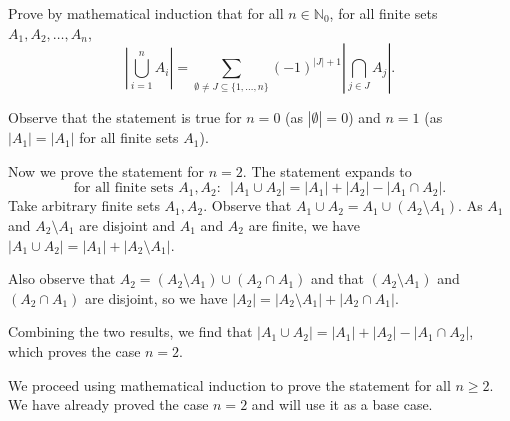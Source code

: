 \documentclass[]{exercises}
\newcommand{\N}{\mathbb{N}}
\begin{document}
\begin{questions}
	\question
	Prove by mathematical induction that for all $n\in\N_0$, for all finite sets $A_1,A_2,\dots,A_n$, \[\left|\bigcup_{i=1}^n A_i\right| = \sum_{\emptyset\neq J\subseteq\{1,\dots,n\}}(-1)^{|J|+1}\left|\bigcap_{j\in J}A_j\right|.\]

	\begin{solution}
		Observe that the statement is true for $n=0$ (as $|\emptyset|=0$) and $n=1$ (as $|A_1|=|A_1|$ for all finite sets $A_1$).

		Now we prove the statement for $n=2$. The statement expands to \[\text{for all finite sets $A_1, A_2$:}~~~|A_1\cup A_2|=|A_1|+|A_2|-|A_1\cap A_2|.\]
		Take arbitrary finite sets $A_1, A_2$. Observe that $A_1\cup A_2=A_1\cup(A_2\setminus A_1)$. As $A_1$ and $A_2\setminus A_1$ are disjoint and $A_1$ and $A_2$ are finite, we have $|A_1\cup A_2| = |A_1|+|A_2\setminus A_1|$.

		Also observe that $A_2=(A_2\setminus A_1)\cup(A_2\cap A_1)$ and that $(A_2\setminus A_1)$ and $(A_2\cap A_1)$ are disjoint, so we have $|A_2|=|A_2\setminus A_1|+|A_2\cap A_1|$.

		Combining the two results, we find that $|A_1\cup A_2|=|A_1|+|A_2|-|A_1\cap A_2|$, which proves the case $n=2$.

		We proceed using mathematical induction to prove the statement for all $n\geq2$. We have already proved the case $n=2$ and will use it as a base case.


\end{solution}
\end{questions}
\end{document}
